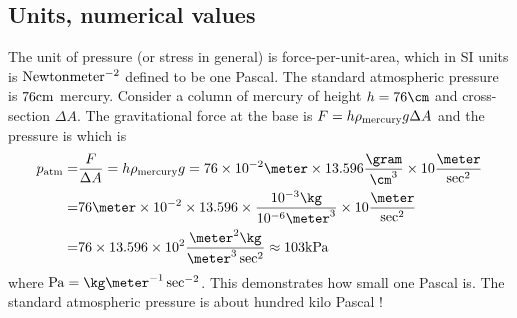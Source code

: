 \documentclass{tufte-book} %
\begin{document}
\subsection{Units, numerical values}
The unit of pressure (or stress in general) is force-per-unit-area,
which in SI units is ${\rm Newton}{\rm meter}^{-2}$ defined to be one
Pascal. The standard atmospheric pressure is $76 {\rm cm}$ mercury.
Consider a column of mercury of height $h = 76 \cm$ and cross-section
$\Delta A$. The gravitational force at the base is $F= h \rho_{\rm
  mercury} g \Delta A$ and the pressure is 
which is 
\begin{eqnarray}
p_{\rm atm} =&\frac{F}{\Delta A} = h\rho_{\rm mercury} g =
76 \times 10^{-2} \meter \times 13.596 \frac{\gram}{\cm^3} \times 10 \frac{\meter}{\sec^2} \nonumber
\nonumber   \\
=&76 \meter\times 10^{-2} \times 13.596 \times \frac{10^{-3}\kg}{10^{-6}
  \meter^3} \times 10 \frac{\meter}{\sec^2} \nonumber \\
=&76\times 13.596\times 10^{2} \frac{\meter^2\kg  }{\meter^3\sec^2}
    \approx 103 {\rm kPa}  \nonumber
\end{eqnarray}
where ${\rm Pa} =  \kg\meter^{-1}\sec^{-2}$. This demonstrates how
small one Pascal is.  The standard atmospheric pressure is about
hundred kilo Pascal ! 
\end{document}
